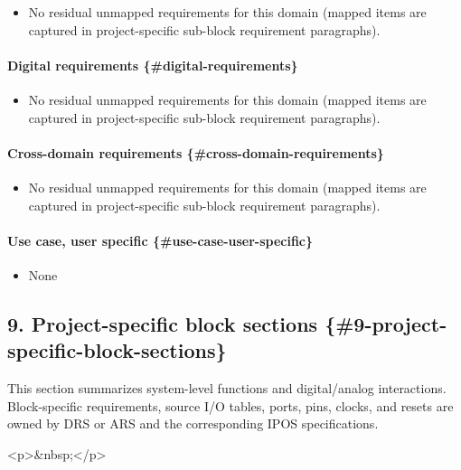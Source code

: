 \documentclass[11pt]{article}
\begin{document}
\begin{itemize}
\item No residual unmapped requirements for this domain (mapped items are captured in project-specific sub-block requirement paragraphs).
\end{itemize}

\paragraph{Digital requirements \{\#digital-requirements\}}


\begin{itemize}
\item No residual unmapped requirements for this domain (mapped items are captured in project-specific sub-block requirement paragraphs).
\end{itemize}

\paragraph{Cross-domain requirements \{\#cross-domain-requirements\}}


\begin{itemize}
\item No residual unmapped requirements for this domain (mapped items are captured in project-specific sub-block requirement paragraphs).
\end{itemize}

\paragraph{Use case, user specific \{\#use-case-user-specific\}}


\begin{itemize}
\item None
\end{itemize}

\subsection{9. Project-specific block sections \{\#9-project-specific-block-sections\}}


This section summarizes system-level functions and digital/analog interactions. Block-specific requirements, source I/O tables, ports, pins, clocks, and resets are owned by DRS or ARS and the corresponding IPOS specifications.

<p>\&nbsp;</p>
\end{document}
